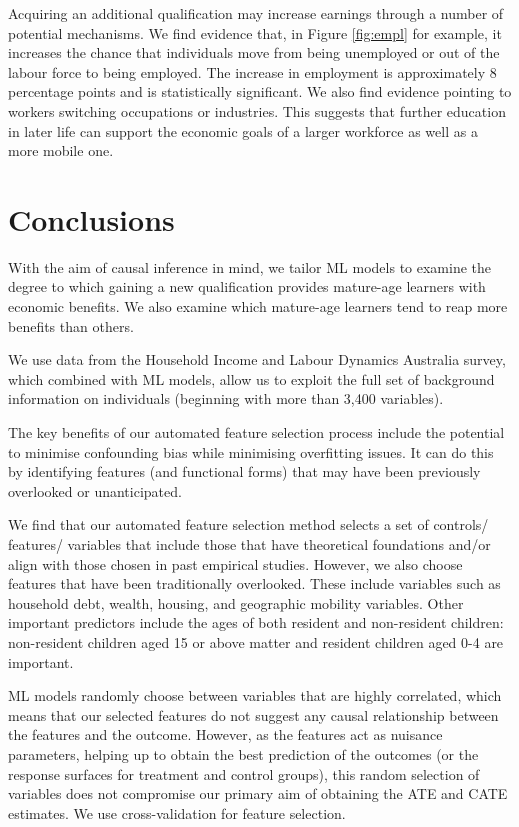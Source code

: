 \documentclass[12pt, a4paper]{article}
\begin{document}
Acquiring an additional qualification may increase earnings through a number of potential mechanisms. We find evidence that, in Figure \ref{fig:empl} for example, it increases the chance that individuals move from being unemployed or out of the labour force to being employed. The increase in employment is approximately 8 percentage points and is statistically significant. We also find evidence pointing to workers switching occupations or industries. This suggests that further education in later life can support the economic goals of a larger workforce as well as a more mobile one.


\section{Conclusions}

With the aim of causal inference in mind, we tailor ML models to examine the degree to which gaining a new qualification provides mature-age learners with economic benefits. We also examine which mature-age learners tend to reap more benefits than others.

We use data from the Household Income and Labour Dynamics Australia survey, which combined with ML models, allow us to exploit the full set of background information on individuals (beginning with more than 3,400 variables).

The key benefits of our automated feature selection process include the potential to minimise confounding bias while minimising overfitting issues. It can do this by identifying features (and functional forms) that may have been previously overlooked or unanticipated.

We find that our automated feature selection method selects a set of controls/ features/ variables that include those that have theoretical foundations and/or align with those chosen in past empirical studies. However, we also choose features that have been traditionally overlooked. These include variables such as household debt, wealth, housing, and geographic mobility variables. Other important predictors include the ages of both resident and non-resident children: non-resident children aged 15 or above matter and resident children aged 0-4 are important.

ML models randomly choose between variables that are highly correlated, which means that our selected features do not suggest any causal relationship between the features and the outcome. However, as the features act as nuisance parameters, helping up to obtain the best prediction of the outcomes (or the response surfaces for treatment and control groups), this random selection of variables does not compromise our primary aim of obtaining the ATE and CATE estimates. We use cross-validation for feature selection.
\end{document}
